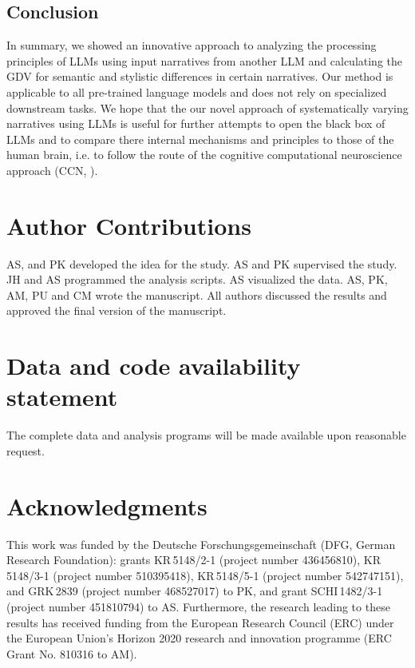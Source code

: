 \subsection*{Conclusion}
In summary, we showed an innovative approach to analyzing the processing principles of LLMs using input narratives from another LLM and calculating the GDV for semantic and stylistic differences in certain narratives. Our method is applicable to all pre-trained language models and does not rely on specialized downstream tasks. We hope that the our novel approach of systematically varying narratives using LLMs is useful for further attempts to open the black box of LLMs and to compare there internal mechanisms and principles to those of the human brain, i.e. to follow the route of the cognitive computational neuroscience approach (CCN, \cite{kriegeskorte2018cognitive}).


\section*{Author Contributions}
AS, and PK developed the idea for the study. AS and PK supervised the study. JH and AS programmed the analysis scripts. AS visualized the data. AS, PK, AM, PU and CM wrote the manuscript. All authors discussed the results and approved the final version of the manuscript.

\section*{Data and code availability statement}
The complete data and analysis programs will be made available upon reasonable request.

\section*{Acknowledgments}
This work was funded by the Deutsche Forschungsgemeinschaft (DFG, German Research Foundation): grants KR\,5148/2-1 (project number 436456810), KR\,5148/3-1 (project number 510395418), KR\,5148/5-1 (project number 542747151), and GRK\,2839 (project number 468527017) to PK, and grant SCHI\,1482/3-1 (project number 451810794) to AS. Furthermore, the research leading to these results has received funding from the European Research Council (ERC) under the European Union’s Horizon 2020 research and innovation programme (ERC Grant No. 810316 to AM).






